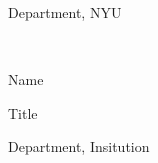 {\vspace{-.2 in}

\hspace{1.5 in} Department, NYU

\vspace{.5 in}





\hspace{1.5 in} \hrulefill\

\vspace{-.2 in}

\hspace{1.5 in} Name
\vspace{-.1 in}

\hspace{1.5 in} Title
\vspace{-.2 in}

\hspace{1.5 in} Department, Insitution


}
